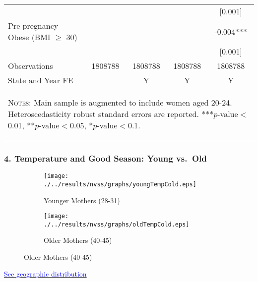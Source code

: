 \documentclass[10pt,letterpaper,subeqn]{beamer}
\begin{document}
\begin{frame}
\begin{table}[htbp]
{\begin{tabular}{l*{4}{c}}
        &               &               &               &     [0.001]   \\
        Pre-pregnancy Obese (BMI $\geq$ 30)&               &               &               &      -0.004***\\
        &               &               &               &     [0.001]   \\
        \midrule
        Observations        &     1808788   &     1808788   &     1808788   &     1808788   \\
        State and Year FE&&Y&Y&Y\\  \bottomrule
        \multicolumn{5}{p{16.4cm}}{\begin{footnotesize}  \textsc{Notes:}  Main sample is augmented to include women aged 20-24. Heteroscedasticity robust standard errors are reported.
            ***$p$-value$<$0.01, **$p$-value$<$0.05, *$p$-value$<$0.1.
  \end{footnotesize}}\end{tabular}}\end{table}
  \end{frame}





\begin{frame}[label=weather]
\frametitle{4. Temperature and Good Season: Young vs.\ Old}
\begin{figure}[htpb!]
\begin{center}
\label{fig:tempUSA}
\begin{subfigure}{.5\textwidth}
  \centering
  \texttt{[image: ./../results/nvss/graphs/youngTempCold.eps]}
  \caption{Younger Mothers (28-31)}
  \label{fig:tempUSAYoung}
\end{subfigure}%
\begin{subfigure}{.5\textwidth}
  \centering
  \texttt{[image: ./../results/nvss/graphs/oldTempCold.eps]}
  \caption{Older Mothers (40-45)}
  \label{fig:tempUSAOld}
\end{subfigure}
\end{center}
\end{figure}

\vspace{8mm}
\hyperlink{USyoung}{\footnotesize \textcolor{blue}{See geographic distribution}}
\end{frame}
\end{document}
